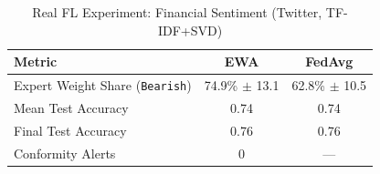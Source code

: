 \begin{table}[h]
\centering
\caption{Real FL Experiment: Financial Sentiment (Twitter, TF-IDF+SVD)}
\label{tab:financial_real}
\begin{tabular}{lcc}
\toprule
Metric & EWA & FedAvg \\
\midrule
Expert Weight Share (\texttt{Bearish}) & 74.9\% $\pm$ 13.1 & 62.8\% $\pm$ 10.5 \\
Mean Test Accuracy & 0.74 & 0.74 \\
Final Test Accuracy & 0.76 & 0.76 \\
Conformity Alerts & 0 & — \\
\bottomrule
\end{tabular}
\end{table}
